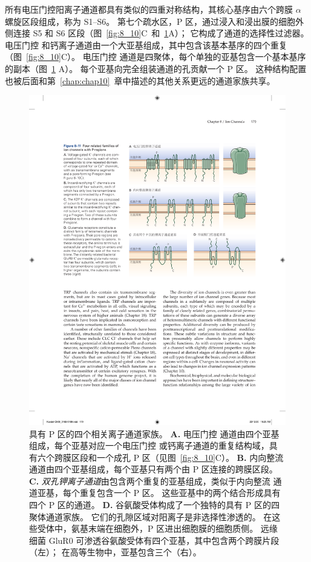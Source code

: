 所有电压门控阳离子通道都具有类似的四重对称结构，其核心基序由六个跨膜 $\alpha$ 螺旋区段组成，称为 S1–S6。
第七个疏水区，P 区，通过浸入和浸出膜的细胞外侧连接 S5 和 S6 区段（图~\ref{fig:8_10}C~和~\ref{fig:8_11}A）；
它构成了通道的选择性过滤器。
电压门控  和钙离子通道由一个大亚基组成，其中包含该基本基序的四个重复（图~\ref{fig:8_10}C）。 
电压门控  通道是四聚体，每个单独的亚基包含一个基本基序的副本（图~\ref{fig:8_11} A）。
每个亚基向完全组装通道的孔贡献一个 P 区。
这种结构配置也被后面和第~\ref{chap:chap10}~章中描述的其他关系更远的通道家族共享。


\begin{figure}[htbp]
	\centering
	\includegraphics[width=0.7\linewidth]{chap08/fig_8_11}
	\caption{具有 P 区的四个相关离子通道家族。
		\textbf{A.} 电压门控  通道由四个亚基组成，每个亚基对应一个电压门控  或钙离子通道的重复结构域，具有六个跨膜区段和一个成孔 P 区（见图~\ref{fig:8_10}C）。
		\textbf{B.} 内向整流  通道由四个亚基组成，每个亚基只有两个由 P 区连接的跨膜区段。
		\textbf{C.} \textit{双孔钾离子通道}由包含两个重复的亚基组成，类似于内向整流  通道亚基，每个重复包含一个 P 区。
		这些亚基中的两个结合形成具有四个 P 区的通道。
		\textbf{D.} 谷氨酸受体构成了一个独特的具有 P 区的四聚体通道家族。
		它们的孔隙区域对阳离子是非选择性渗透的。
		在这些受体中，氨基末端在细胞外，P 区进出细胞膜的细胞质侧。
		远缘细菌 GluR0  可渗透谷氨酸受体有四个亚基，其中包含两个跨膜片段（左）；
		在高等生物中，亚基包含三个（右）。}
	\label{fig:8_11}
\end{figure}


